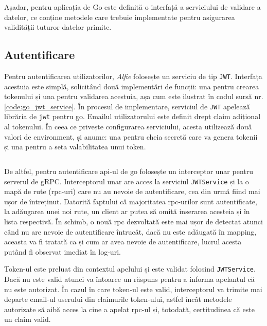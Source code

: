 Așadar, pentru aplicația de Go este definită o interfață a serviciului de validare a datelor, ce conține metodele care trebuie implementate pentru asigurarea validității tuturor datelor primite.

\subsection{Autentificare}

Pentru autentificarea utilizatorilor, \textit{Alfie} folosește un serviciu de tip \texttt{JWT}. Interfața acestuia este simplă, solicitând două implementări de funcții: una pentru crearea tokenului și una pentru validarea acestuia, așa cum este ilustrat în codul sursă nr. \ref{code:go_jwt_service}. În procesul de implementare, serviciul de \texttt{JWT} apelează librăria de \texttt{jwt} pentru go. Emailul utilizatorului este definit drept claim adițional al tokenului. În ceea ce privește configurarea serviciului, acesta utilizează două valori de environment, și anume: una pentru cheia secretă care va genera tokenii și una pentru a seta valabilitatea unui token.

\begin{code}
    \inputminted[frame=single,framesep=2mm,linenos,breaklines,tabsize=2]{go}{code/jwt-service.go}
    \label{code:go_jwt_service}
\end{code}

De altfel, pentru autentificare api-ul de go folosește un interceptor unar pentru serverul de gRPC. Interceptorul unar are acces la serviciul \texttt{JWTService} și la o mapă de rute (rpc-uri) care nu au nevoie de autentificare, cea din urmă fiind mai ușor de întreținut. Datorită faptului că majoritatea rpc-urilor sunt autentificate, la adăugarea unei noi rute, un client ar putea să omită inserarea acesteia și în lista respectivă. În schimb, o nouă rpc dezvoltată este mai ușor de detectat atunci când nu are nevoie de autentificare întrucât, dacă nu este adăugată în mapping, aceasta va fi tratată ca și cum ar avea nevoie de autentificare, lucrul acesta putând fi observat imediat în log-uri.

Token-ul este preluat din contextul apelului și este validat folosind \texttt{JWTService}. Dacă nu este valid atunci va întoarce un răspuns pentru a informa apelantul că nu este autorizat. În cazul în care token-ul este valid, interceptorul va trimite mai departe email-ul userului din claimurile token-ului, astfel încât metodele autorizate să aibă acces la cine a apelat rpc-ul și, totodată, certitudinea că este un claim valid.

